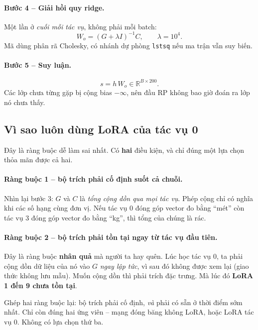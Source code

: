 \documentclass[11pt,a4paper]{article}
\begin{document}
\paragraph{Bước 4 -- Giải hồi quy ridge.}
Một lần ở \emph{cuối mỗi tác vụ}, không phải mỗi batch:
\[ W_o = (G + \lambda I)^{-1} C, \qquad \lambda = 10^4 . \]
Mã dùng phân rã Cholesky, có nhánh dự phòng \texttt{lstsq} nếu ma trận vẫn suy
biến.

\paragraph{Bước 5 -- Suy luận.}
\[ s = h\,W_o \in \mathbb{R}^{B \times 200} . \]
Các lớp chưa từng gặp bị cộng bias $-\infty$, nên đầu RP không bao giờ đoán ra
lớp nó chưa thấy.

\subsection{Vì sao luôn dùng LoRA của tác vụ 0}
\label{sec:lora0}

Đây là ràng buộc dễ làm sai nhất. Có \textbf{hai} điều kiện, và chỉ đúng một lựa
chọn thỏa mãn được cả hai.

\paragraph{Ràng buộc 1 -- bộ trích phải cố định suốt cả chuỗi.}
Nhìn lại bước 3: $G$ và $C$ là \emph{tổng cộng dồn qua mọi tác vụ}. Phép cộng chỉ
có nghĩa khi các số hạng cùng đơn vị. Nếu tác vụ 0 đóng góp vector đo bằng
``mét'' còn tác vụ 3 đóng góp vector đo bằng ``kg'', thì tổng của chúng là rác.

\paragraph{Ràng buộc 2 -- bộ trích phải tồn tại ngay từ tác vụ đầu tiên.}
Đây là ràng buộc \textbf{nhân quả} mà người ta hay quên. Lúc học tác vụ 0, ta
phải cộng dồn dữ liệu của nó vào $G$ \emph{ngay lập tức}, vì sau đó không được
xem lại (giao thức không lưu mẫu). Muốn cộng dồn thì phải trích đặc trưng. Mà
lúc đó \textbf{LoRA 1 đến 9 chưa tồn tại}.

\medskip\noindent
Ghép hai ràng buộc lại: bộ trích phải cố định, \emph{và} phải có sẵn ở thời điểm
sớm nhất. Chỉ còn đúng hai ứng viên -- mạng đóng băng không LoRA, hoặc LoRA tác
vụ 0. Không có lựa chọn thứ ba.
\end{document}
